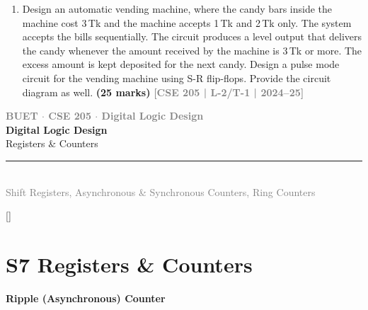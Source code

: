 \documentclass[12pt,a4paper]{article}
\newcommand{\yr}[1]{\hfill\textcolor{gray}{\small\textbf{[#1]}}}
\newcommand{\mk}[1]{\textcolor{orange!70!black}{\small\textbf{(#1 marks)}}}
\newcommand{\subtopic}[2]{%
  \vspace{10pt}
  \noindent\begin{tcolorbox}[colback=#1!8,colframe=#1,boxrule=0.6pt,arc=4pt,
    left=6pt,right=6pt,top=4pt,bottom=4pt]
    \small\bfseries\textcolor{#1}{#2}
  \end{tcolorbox}
  \vspace{2pt}
}
\newcommand{\secdivider}[4]{%
  \newpage\thispagestyle{empty}%
  \vspace*{\fill}%
  \begin{tcolorbox}[enhanced,colback=#4!7,colframe=#3,boxrule=1.5pt,arc=8pt,
    left=20pt,right=20pt,top=22pt,bottom=22pt,
    shadow={3pt}{-3pt}{0pt}{black!15}]
    \centering
    {\large\textcolor{gray}{\textbf{BUET $\cdot$ CSE 205 $\cdot$ Digital Logic Design}}}\\[8pt]
    {\fontsize{26}{32}\selectfont\bfseries\textcolor{#3}{Digital Logic Design}}\\[6pt]
    {\fontsize{15}{19}\selectfont\textcolor{dgray}{#1}}\\[12pt]
    \textcolor{#3!60}{\rule{0.5\textwidth}{0.5pt}}\\[6pt]
    {\small\textcolor{gray}{#2}}
  \end{tcolorbox}%
  \vspace*{\fill}\newpage%
}
\begin{document}
\begin{enumerate}
\item Design an automatic vending machine, where the candy bars inside the machine cost 3\,Tk and the machine accepts 1\,Tk and 2\,Tk only. The system accepts the bills sequentially. The circuit produces a level output that delivers the candy whenever the amount received by the machine is 3\,Tk or more. The excess amount is kept deposited for the next candy. Design a pulse mode circuit for the vending machine using S-R flip-flops. Provide the circuit diagram as well.
\mk{25} \yr{CSE 205 | L-2/T-1 | 2024--25}

\end{enumerate}


\secdivider{Registers \& Counters}{Shift Registers, Asynchronous \& Synchronous Counters, Ring Counters}{cG}{pink!60!red}

\label{sec:S7}
\titleformat{\section}{\large\bfseries\color{cG}}{}{0em}{}[\titlerule]
\section*{S7 \quad Registers \& Counters}

\subtopic{cG}{Ripple (Asynchronous) Counter}
\label{sub:s7-ripple}
\end{document}
